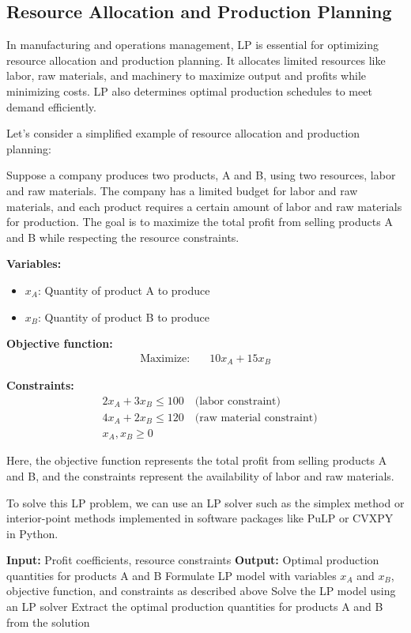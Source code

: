 \documentclass[12pt]{book} %
\begin{document}
\subsection{Resource Allocation and Production Planning}

In manufacturing and operations management, LP is essential for optimizing resource allocation and production planning. It allocates limited resources like labor, raw materials, and machinery to maximize output and profits while minimizing costs. LP also determines optimal production schedules to meet demand efficiently.

Let's consider a simplified example of resource allocation and production planning:

Suppose a company produces two products, A and B, using two resources, labor and raw materials. The company has a limited budget for labor and raw materials, and each product requires a certain amount of labor and raw materials for production. The goal is to maximize the total profit from selling products A and B while respecting the resource constraints.

\textbf{Variables:}
\begin{itemize}
    \item \(x_A\): Quantity of product A to produce
    \item \(x_B\): Quantity of product B to produce
\end{itemize}

\textbf{Objective function:}
\begin{align*}
\text{Maximize:} \quad & 10x_A + 15x_B
\end{align*}

\textbf{Constraints:}
\begin{align*}
& 2x_A + 3x_B \leq 100 \quad \text{(labor constraint)} \\
& 4x_A + 2x_B \leq 120 \quad \text{(raw material constraint)} \\
& x_A, x_B \geq 0
\end{align*}

Here, the objective function represents the total profit from selling products A and B, and the constraints represent the availability of labor and raw materials.

To solve this LP problem, we can use an LP solver such as the simplex method or interior-point methods implemented in software packages like PuLP or CVXPY in Python.

\FloatBarrier
\begin{algorithm}
    \caption{Resource Allocation and Production Planning using Linear Programming}
    \begin{algorithmic}[1]
        \State \textbf{Input:} Profit coefficients, resource constraints
        \State \textbf{Output:} Optimal production quantities for products A and B
        \State Formulate LP model with variables \(x_A\) and \(x_B\), objective function, and constraints as described above
        \State Solve the LP model using an LP solver
        \State Extract the optimal production quantities for products A and B from the solution
    \end{algorithmic}
\end{algorithm}
\FloatBarrier
\end{document}

